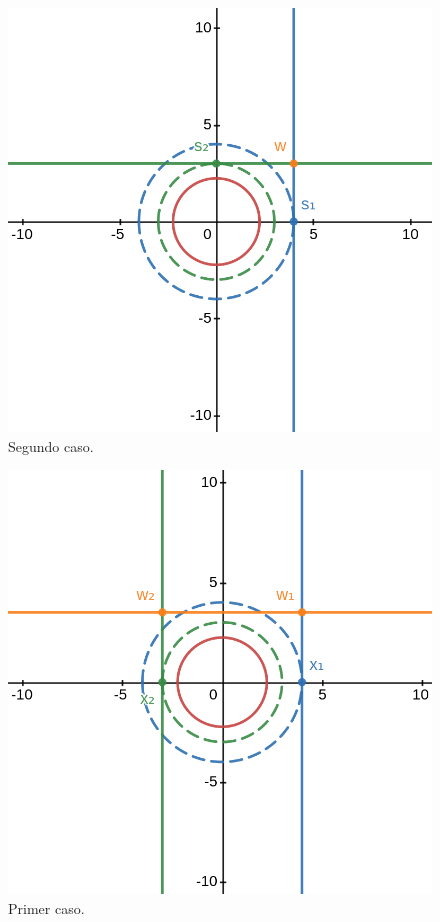 \documentclass{article}
\begin{document}
\begin{figure}
    \begin{center}
        \includegraphics[width=.65\textwidth]{caso2}
    \end{center}
    \caption{Segundo caso.}
\end{figure}
%
\begin{figure}
    \begin{center}
        \includegraphics[width=.65\textwidth]{caso1}
    \end{center}
    \caption{Primer caso.}
\end{figure}


\end{document}
